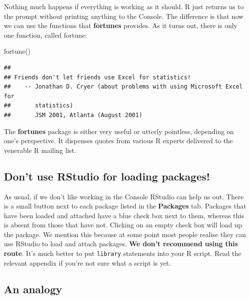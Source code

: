 \documentclass[
]{book}
\newenvironment{Shaded}{\begin{snugshade}}{\end{snugshade}}
\newcommand{\FunctionTok}[1]{\textcolor[rgb]{0.00,0.00,0.00}{#1}}
\newcommand{\NormalTok}[1]{#1}
\newenvironment{greybox}{
  \definecolor{shadecolor}{rgb}{0.95,0.95,0.95}  %
  \color{black}
  \begin{shaded}}
 {\end{shaded}}
\newenvironment{infobox}[1]
  {
  \begin{itemize}
  \renewcommand{\labelitemi}{
    \raisebox{-.7\height}[0pt][0pt]{
      {\setkeys{Gin}{width=3em,keepaspectratio}
        \texttt{[image: images/\#1]}}
    }
  }
  \setlength{\fboxsep}{1em}
  \begin{greybox}
  \item
  }
  {
  \end{greybox}
  \end{itemize}
  }
\begin{document}
Nothing much happens if everything is working as it should. R just returns us to the prompt without printing anything to the Console. The difference is that now we can use the functions that \textbf{fortunes} provides. As it turns out, there is only one function, called fortune:

\begin{Shaded}
\begin{Highlighting}[]
\FunctionTok{fortune}\NormalTok{()}
\end{Highlighting}
\end{Shaded}

\begin{verbatim}
## 
## Friends don't let friends use Excel for statistics!
##    -- Jonathan D. Cryer (about problems with using Microsoft Excel for
##       statistics)
##       JSM 2001, Atlanta (August 2001)
\end{verbatim}

The \textbf{fortunes} package is either very useful or utterly pointless, depending on one's perspective. It dispenses quotes from various R experts delivered to the venerable R mailing list.

\begin{infobox}{warning}

\hypertarget{dont-use-rstudio-for-loading-packages}{%
\subsection{Don't use RStudio for loading packages!}\label{dont-use-rstudio-for-loading-packages}}

As usual, if we don't like working in the Console RStudio can help us out. There is a small button next to each package listed in the \textbf{Packages} tab. Packages that have been loaded and attached have a blue check box next to them, whereas this is absent from those that have not. Clicking on an empty check box will load up the package. We mention this because at some point most people realise they can use RStudio to load and attach packages. \textbf{We don't recommend using this route}. It's much better to put \texttt{library} statements into your R script. Read the relevant appendix if you're not sure what a script is yet.

\end{infobox}

\hypertarget{an-analogy}{%
\subsection{An analogy}\label{an-analogy}}
\end{document}

